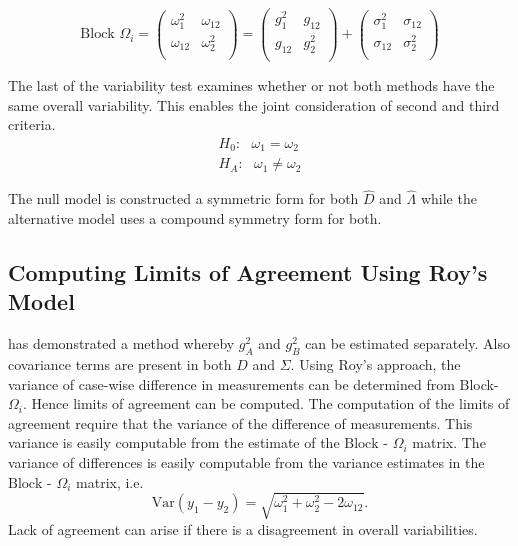 \documentclass[12pt, a4paper]{report}
\theoremstyle{plain}
\theoremstyle{definition}
\theoremstyle{remark}
\begin{document}
	\begin{center}
		\[\mbox{Block } {\Omega}_i = \left(\begin{array}{cc}
		\omega^2_1  & \omega_{12} \\
		\omega_{12} & \omega^2_2 \\
		\end{array}  \right)
		=  \left(
		\begin{array}{cc}
		g^2_1  & g_{12} \\
		g_{12} & g^2_2 \\
		\end{array} \right)+
		\left(
		\begin{array}{cc}
		\sigma^2_1  & \sigma_{12} \\
		\sigma_{12} & \sigma^2_2 \\
		\end{array}\right)
		\]
	\end{center}
	
	The last of the variability test examines whether or not both methods have the same overall variability. This enables the joint consideration of second and third criteria.
	\begin{eqnarray*}
		H_{0}: \mbox{ }\omega_{1}  = \omega_{2} \\
		H_{A}: \mbox{ }\omega_{1}  \neq \omega_{2}
	\end{eqnarray*}
	
	The null model is constructed a symmetric form for both ${\hat{D}}$ and ${\hat{\Lambda}}$ while the alternative model uses a compound symmetry form for both.
	
	
	
	
	
	
	\subsection{Computing Limits of Agreement Using Roy's Model}
	\citet{ARoy2009} has demonstrated a method whereby $g^2_{A}$ and $g^2_{B}$ can be estimated separately. Also covariance terms are present in both ${D}$ and ${\Sigma}$. Using Roy's approach, the variance of case-wise difference in measurements can be determined from Block-${\Omega}_{i}$. Hence limits of agreement can be computed. The computation of the limits of agreement require that the variance of the difference of measurements. This variance is easily computable from the estimate of the ${\mbox{Block - } \Omega_{i}}$ matrix.
	The variance of differences is easily computable from the variance estimates in the ${\mbox{Block - } \Omega_{i}}$ matrix, i.e.
	\[
	\mathrm{Var}(y_1 - y_2) = \sqrt{ \omega^2_1 + \omega^2_2 - 2\omega_{12}}.
	\]	
	Lack of agreement can arise if there is a disagreement in overall variabilities. 
	
\end{document}
